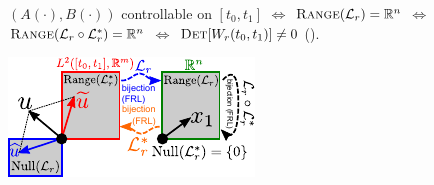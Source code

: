 \begin{Theorem}
$(A(\cdot),B(\cdot))$ controllable on $[t_0,t_1]$ $\Leftrightarrow$ $\textsc{Range}(\mathcal L_r)=\mathbb R^n$ $\Leftrightarrow$ $\textsc{Range}(\mathcal L_r\circ\mathcal L_r^*)=\mathbb R^n$ $\Leftrightarrow$ $\textsc{Det}[W_r(t_0,t_1)]\ne 0$ ().
\end{Theorem}
\begin{minipage}{0.2\columnwidth}
\begin{turn}{90}
\includegraphics[height=1\columnwidth]{figures/lin_space_decomposition_reachability.pdf}
\end{turn}
\end{minipage}%
